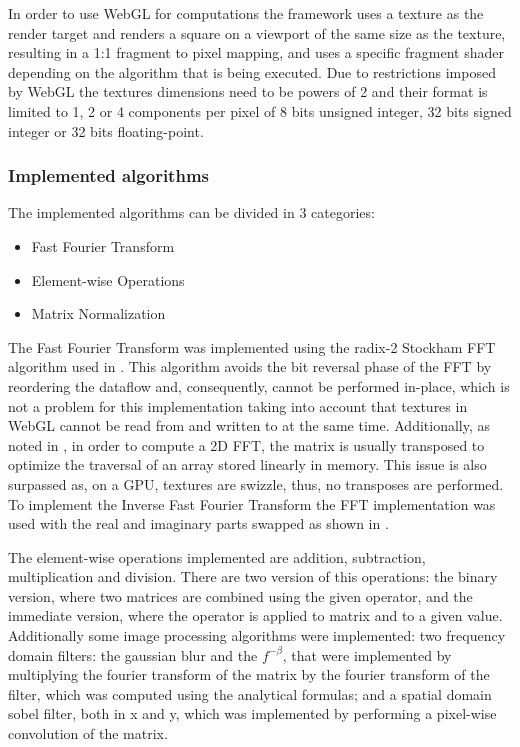       In order to use WebGL for computations the framework uses a texture as the render target and renders a square on a viewport of the same size as the texture, resulting in a 1:1 fragment to pixel mapping, and uses a specific fragment shader depending on the algorithm that is being executed. Due to restrictions imposed by WebGL the textures dimensions need to be powers of 2 and their format is limited to 1, 2 or 4 components per pixel of 8 bits unsigned integer, 32 bits signed integer or 32 bits floating-point.
      
	  \subsubsection{Implemented algorithms}
	  
	    The implemented algorithms can be divided in 3 categories:
	    \begin{itemize}
	      \item Fast Fourier Transform
	      \item Element-wise Operations
	      \item Matrix Normalization
	    \end{itemize}
	    
	    The Fast Fourier Transform was implemented using the radix-2 Stockham FFT algorithm used in \cite{Lloyd2008}. This algorithm avoids the bit reversal phase of the FFT by reordering the dataflow and, consequently, cannot be performed in-place, which is not a problem for this implementation taking into account that textures in WebGL cannot be read from and written to at the same time. Additionally, as noted in \cite{Lloyd2008}, in order to compute a 2D FFT, the matrix is usually transposed to optimize the traversal of an array stored linearly in memory. This issue is also surpassed as, on a GPU, textures are swizzle, thus, no transposes are performed. 
	    To implement the Inverse Fast Fourier Transform the FFT implementation was used with the real and imaginary parts swapped as shown in \cite[p.450]{Lyons2004}.
	    
	    The element-wise operations implemented are addition, subtraction, multiplication and division. There are two version of this operations: the binary version, where two matrices are combined using the given operator, and the immediate version, where the operator is applied to matrix and to a given value. Additionally some image processing algorithms were implemented: two frequency domain filters: the gaussian blur and the $f^{-\beta}$, that were implemented by multiplying the fourier transform of the matrix by the fourier transform of the filter, which was computed using the analytical formulas; and a spatial domain sobel filter, both in x and y, which was implemented by performing a pixel-wise convolution of the matrix.
	    
